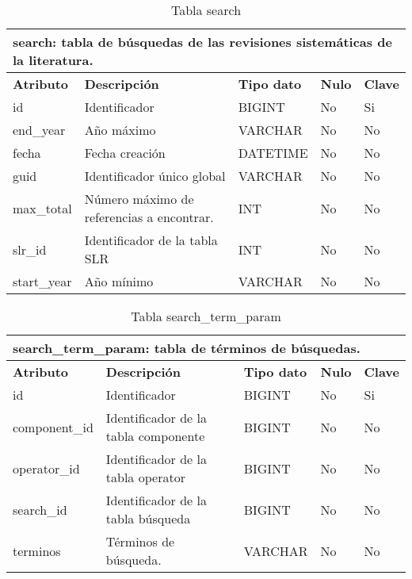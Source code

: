\begin{table}[!hbt]
	\begin{center}
		\begin{tabular}{|p{3cm}|p{4cm}|p{4cm}|p{2cm}|p{2cm}|}
			\hline
			\multicolumn{5}{|l|}{\textbf{search:} tabla de búsquedas de las revisiones sistemáticas de la literatura.} \\
			\hline
			\hline
			\textbf{Atributo} & \textbf{Descripción} & \textbf{Tipo dato} & \textbf{Nulo} & \textbf{Clave}\\
			\hline
			id & Identificador  & BIGINT & No & Si\\
			\hline
			end\_year & Año máximo & VARCHAR & No & No\\
			\hline
			fecha & Fecha creación & DATETIME & No & No\\
			\hline
			guid & Identificador único global & VARCHAR & No & No\\
			\hline
			max\_total & Número máximo de referencias a encontrar. & INT & No & No\\
			\hline
			slr\_id & Identificador de la tabla SLR & INT & No & No\\
			\hline
			start\_year & Año mínimo & VARCHAR & No & No\\
			\hline
		\end{tabular}
		\caption{Tabla search}
		\label{table:db-search}
	\end{center}
\end{table}

\begin{table}[!hbt]
	\begin{center}
		\begin{tabular}{|p{3cm}|p{4cm}|p{4cm}|p{2cm}|p{2cm}|}
			\hline
			\multicolumn{5}{|l|}{\textbf{search\_term\_param:} tabla de términos de búsquedas.} \\
			\hline
			\hline
			\textbf{Atributo} & \textbf{Descripción} & \textbf{Tipo dato} & \textbf{Nulo} & \textbf{Clave}\\
			\hline
			id & Identificador  & BIGINT & No & Si\\
			\hline
			component\_id & Identificador de la tabla componente & BIGINT & No & No\\
			\hline
			operator\_id & Identificador de la tabla operator & BIGINT & No & No\\
			\hline
			search\_id & Identificador de la tabla búsqueda & BIGINT & No & No\\
			\hline
			terminos & Términos de búsqueda. & VARCHAR & No & No\\
			\hline
		\end{tabular}
		\caption{Tabla search\_term\_param}
		\label{table:db-searchtermparam}
	\end{center}
\end{table}


